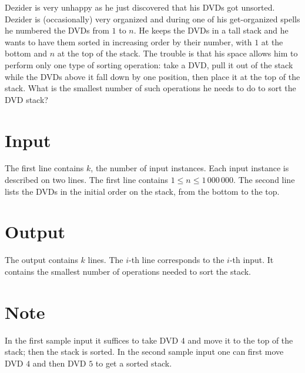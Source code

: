 
Dezider is very unhappy as he just discovered that his DVDs got unsorted. Dezider is (occasionally) very organized and during one of his get-organized spells he numbered the DVDs from $1$ to $n$. He keeps the DVDs in a tall stack and he wants to have them sorted in increasing order  by their number, with $1$ at the bottom and $n$ at the top of the stack. The trouble is that his space allows him to perform only one type of sorting operation: take a DVD, pull it out of the stack while the DVDs above it fall down by one position, then place it at the top of the stack. What is the smallest number of such operations he needs to do to sort the DVD stack?

\section*{Input}
The first line contains $k$, the number of input instances. Each input instance is described on two
lines. The first line contains $1\leq n\leq 1\,000\,000$. The second line lists the DVDs in the initial
order on the stack, from the bottom to the top.

\section*{Output}
The output contains $k$ lines. The $i$-th line corresponds to the $i$-th input.
It contains the smallest number of operations needed to sort the stack.

\section*{Note}
In the first sample input it suffices to take DVD $4$ and move it to the top of the stack; then the stack is sorted.
In the second sample input one can first move DVD $4$ and then DVD $5$ to get a sorted stack.
